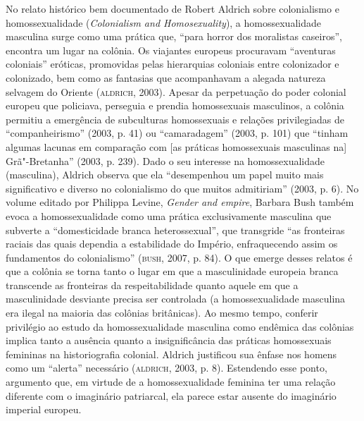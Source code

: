 No relato histórico bem documentado de Robert Aldrich sobre colonialismo
e homossexualidade (\emph{Colonialism and Homosexuality}), a
homossexualidade masculina surge como uma prática que, ``para horror dos
moralistas caseiros'', encontra um lugar na colônia. Os viajantes
europeus procuravam ``aventuras coloniais'' eróticas, promovidas pelas
hierarquias coloniais entre colonizador e colonizado, bem como as
fantasias que acompanhavam a alegada natureza selvagem do Oriente
(\textsc{aldrich}, 2003). Apesar da perpetuação do poder colonial europeu que
policiava, perseguia e prendia homossexuais masculinos, a colônia
permitiu a emergência de subculturas homossexuais e relações
privilegiadas de ``companheirismo'' (2003, p. 41) ou ``camaradagem''
(2003, p. 101) que ``tinham algumas lacunas em comparação com {[}as
práticas homossexuais masculinas na{]} Grã"-Bretanha'' (2003,
p. 239). Dado o seu interesse na homossexualidade (masculina), Aldrich
observa que ela ``desempenhou um papel muito mais significativo e
diverso no colonialismo do que muitos admitiriam'' (2003, p. 6). No
volume editado por Philippa Levine, \emph{Gender and empire}, Barbara
Bush também evoca a homossexualidade como uma prática exclusivamente
masculina que subverte a ``domesticidade branca heterossexual'', que
transgride ``as fronteiras raciais das quais dependia a estabilidade do
Império, enfraquecendo assim os fundamentos do colonialismo'' (\textsc{bush},
2007, p. 84). O que emerge desses relatos é que a colônia se torna tanto o
lugar em que a masculinidade europeia branca transcende as fronteiras da
respeitabilidade quanto aquele em que a masculinidade desviante precisa
ser controlada (a homossexualidade masculina era ilegal na maioria das
colônias britânicas). Ao mesmo tempo, conferir privilégio ao estudo da
homossexualidade masculina como endêmica das colônias implica tanto a
ausência quanto a insignificância das práticas homossexuais femininas na
historiografia colonial. Aldrich justificou sua ênfase nos homens como
um ``alerta'' necessário (\textsc{aldrich}, 2003, p. 8). Estendendo esse ponto,
argumento que, em virtude de a homossexualidade feminina ter uma relação
diferente com o imaginário patriarcal, ela parece estar ausente do
imaginário imperial europeu.

